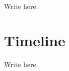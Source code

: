 \documentclass[11pt,letterpaper]{article}
\begin{document}
Write here.


\section{Timeline}

Write here.




\end{document}
